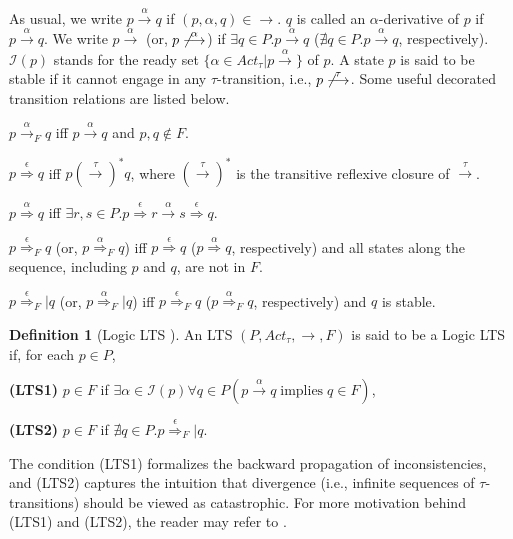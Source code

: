 \documentclass{elsarticle}
\theoremstyle{plain}
\theoremstyle{definition}
\newtheorem{mydefn}[theorem]{Definition}
\begin{document}
As usual, we write $p \stackrel{\alpha}{\longrightarrow} q$ if $(p,\alpha,q)\in \longrightarrow$.
$q$ is called an $\alpha$-derivative of $p$ if $p \stackrel{\alpha}{\longrightarrow}q$.
We write $p \stackrel{\alpha}{\longrightarrow}$ (or, $p \not \stackrel{\alpha}{\longrightarrow}$) if $\exists q\in P.p\stackrel{\alpha}{\longrightarrow}q$ ($\nexists q\in P.p  \stackrel{\alpha}{\longrightarrow}q$, respectively).
$\mathcal{I}(p)$ stands for the ready set $\{\alpha \in Act_{\tau}|p \stackrel{\alpha}{\longrightarrow}\}$ of $p$.
A state $p$ is said to be stable if it cannot engage in any $\tau$-transition, i.e., $p \not\stackrel{\tau}{\longrightarrow}$.
Some useful decorated transition relations are listed below.

$p \stackrel{\alpha}{\longrightarrow}_F q$ iff $p \stackrel{\alpha}{\longrightarrow} q$ and $p,q\notin F$.

$p \stackrel{\epsilon}{\Longrightarrow}q$ iff $p (\stackrel{\tau}{\longrightarrow})^* q$, where $(\stackrel{\tau}{\longrightarrow})^* $ is the transitive reflexive closure of $\stackrel{\tau}{\longrightarrow}$.

$p \stackrel{\alpha}{\Longrightarrow}q$ iff $\exists r,s\in P.p \stackrel{\epsilon}{\Longrightarrow} r \stackrel{\alpha}{\longrightarrow}s \stackrel{\epsilon}{\Longrightarrow} q$.

$p \stackrel{\epsilon}{\Longrightarrow}_F q$ (or, $p \stackrel{\alpha}{\Longrightarrow}_F q$) iff  $p \stackrel{\epsilon}{\Longrightarrow}q$ ($p \stackrel{\alpha}{\Longrightarrow}q$, respectively) and all states along the sequence, including $p$ and $q$, are not in $F$.

$p \stackrel{\epsilon}{\Longrightarrow}_F|q$ (or, $p \stackrel{\alpha}{\Longrightarrow}_F|q$) iff $p \stackrel{\epsilon}{\Longrightarrow}_F q$ ($p \stackrel{\alpha}{\Longrightarrow}_F q$, respectively) and $q$ is stable.

\begin{mydefn}[Logic LTS \cite{Luttgen10}]\label{D:LLTS}
  An LTS $(P,Act_{\tau},\longrightarrow,F)$ is said to be a Logic LTS if, for each $p \in P$,

\noindent\textbf{(LTS1) }$p \in F$ if $\exists\alpha\in \mathcal{I}(p)\forall q\in P(p \stackrel{\alpha}{\longrightarrow}q \;\text{implies}\; q\in F)$,

\noindent\textbf{(LTS2)} $p \in F$ if $\nexists q\in P.p \stackrel{\epsilon}{\Longrightarrow}_F|q$.
\end{mydefn}

The condition (LTS1) formalizes the backward propagation of inconsistencies, and (LTS2) captures the intuition that divergence (i.e., infinite sequences of $\tau$-transitions) should be viewed as catastrophic.
For more motivation behind (LTS1) and (LTS2), the reader may refer to \cite{Luttgen10}.
\end{document}
